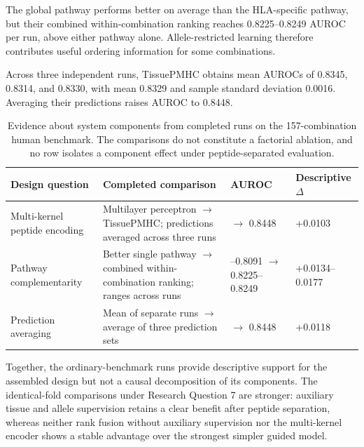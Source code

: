 The global pathway performs better on average than the HLA-specific pathway, but their combined within-combination ranking reaches 0.8225--0.8249 AUROC per run, above either pathway alone. Allele-restricted learning therefore contributes useful ordering information for some combinations.

Across three independent runs, TissuePMHC obtains mean AUROCs of 0.8345, 0.8314, and 0.8330, with mean 0.8329 and sample standard deviation 0.0016. Averaging their predictions raises AUROC to 0.8448.

\begin{table}[t]
\centering
\caption{Evidence about system components from completed runs on the 157-combination human benchmark. The comparisons do not constitute a factorial ablation, and no row isolates a component effect under peptide-separated evaluation.}
\label{tab:component-evidence}
\fontsize{7.5}{8.5}\selectfont
\renewcommand{\arraystretch}{1.20}
\setlength{\tabcolsep}{3pt}
\begin{tabularx}{0.92\textwidth}{@{}>{\raggedright\arraybackslash}p{3.1cm}
                                      >{\raggedright\arraybackslash}X
                                      >{\centering\arraybackslash}p{3.2cm}
                                      >{\centering\arraybackslash}p{1.6cm}@{}}
\toprule
Design question & Completed comparison & AUROC & Descriptive $\Delta$ \\ 
\midrule
Multi-kernel peptide encoding & Multilayer perceptron $\rightarrow$ TissuePMHC; predictions averaged across three runs & 0.8345 $\rightarrow$ 0.8448 & +0.0103 \\ 
Pathway complementarity & Better single pathway $\rightarrow$ combined within-combination ranking; ranges across runs & 0.8072--0.8091 $\rightarrow$ 0.8225--0.8249 & +0.0134--0.0177 \\ 
Prediction averaging & Mean of separate runs $\rightarrow$ average of three prediction sets & 0.8329 $\rightarrow$ 0.8448 & +0.0118 \\ 
\bottomrule
\end{tabularx}
\end{table}

Together, the ordinary-benchmark runs provide descriptive support for the assembled design but not a causal decomposition of its components. The identical-fold comparisons under Research Question 7 are stronger: auxiliary tissue and allele supervision retains a clear benefit after peptide separation, whereas neither rank fusion without auxiliary supervision nor the multi-kernel encoder shows a stable advantage over the strongest simpler guided model.

